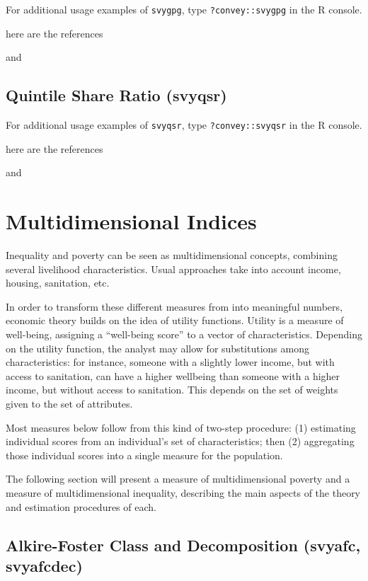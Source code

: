 \documentclass[]{book}
\begin{document}
For additional usage examples of \texttt{svygpg}, type
\texttt{?convey::svygpg} in the R console.

here are the references

\citep{osier2009} and \citep{deville1999}

\section{Quintile Share Ratio
(svyqsr)}\label{quintile-share-ratio-svyqsr}

For additional usage examples of \texttt{svyqsr}, type
\texttt{?convey::svyqsr} in the R console.

here are the references

\citep{osier2009} and \citep{deville1999}

\chapter{Multidimensional Indices}\label{multidimensional}

Inequality and poverty can be seen as multidimensional concepts,
combining several livelihood characteristics. Usual approaches take into
account income, housing, sanitation, etc.

In order to transform these different measures from into meaningful
numbers, economic theory builds on the idea of utility functions.
Utility is a measure of well-being, assigning a ``well-being score'' to
a vector of characteristics. Depending on the utility function, the
analyst may allow for substitutions among characteristics: for instance,
someone with a slightly lower income, but with access to sanitation, can
have a higher wellbeing than someone with a higher income, but without
access to sanitation. This depends on the set of weights given to the
set of attributes.

Most measures below follow from this kind of two-step procedure: (1)
estimating individual scores from an individual's set of
characteristics; then (2) aggregating those individual scores into a
single measure for the population.

The following section will present a measure of multidimensional poverty
and a measure of multidimensional inequality, describing the main
aspects of the theory and estimation procedures of each.

\section{Alkire-Foster Class and Decomposition (svyafc,
svyafcdec)}\label{alkire-foster-class-and-decomposition-svyafc-svyafcdec}
\end{document}
